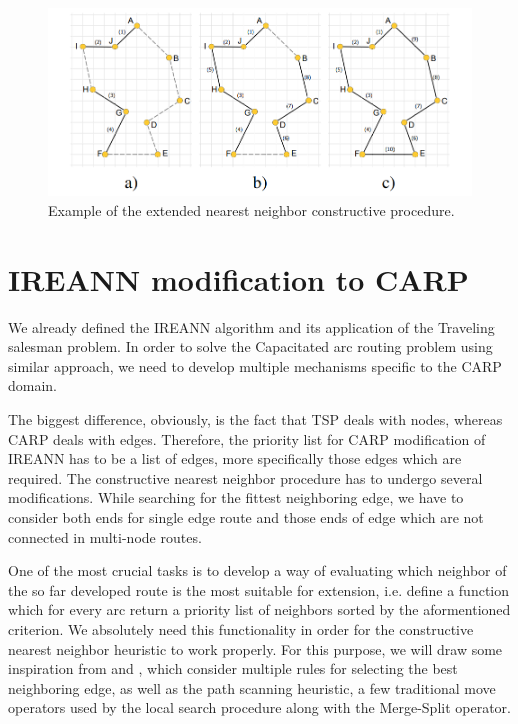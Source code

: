 \documentclass[twoside]{ctuthesis}
\theoremstyle{plain}
\theoremstyle{definition}
\theoremstyle{note}
\begin{document}
\begin{figure}
	\includegraphics[width=\linewidth]{tspexample.png}
	\caption{Example of the extended nearest neighbor constructive
		procedure.}
	\label{fig:tsp}
\end{figure}


\section{IREANN modification to CARP}
We already defined the IREANN algorithm and its application of the Traveling salesman problem. In order to solve the Capacitated arc routing problem using similar approach, we need to develop multiple mechanisms specific to the CARP domain.

The biggest difference, obviously, is the fact that TSP deals with nodes, whereas CARP deals with edges. Therefore, the priority list for CARP modification of IREANN has to be a list of edges, more specifically those edges which are required. The constructive nearest neighbor procedure has to undergo several modifications. While searching for the fittest neighboring edge, we have to consider both ends for single edge route and those ends of edge which are not connected in multi-node routes.

One of the most crucial tasks is to develop a way of evaluating which neighbor of the so far developed route is the most suitable for extension, i.e. define a function which for every arc return a priority list of neighbors sorted by the aformentioned criterion. We absolutely need this functionality in order for the constructive nearest neighbor heuristic to work properly. For this purpose, we will draw some inspiration from \cite{5200351} and \cite{ULUSOY1985329}, which consider multiple rules for selecting the best neighboring edge, as well as the path scanning heuristic, a few traditional move operators used by the local search procedure along with the Merge-Split operator.
\end{document}
